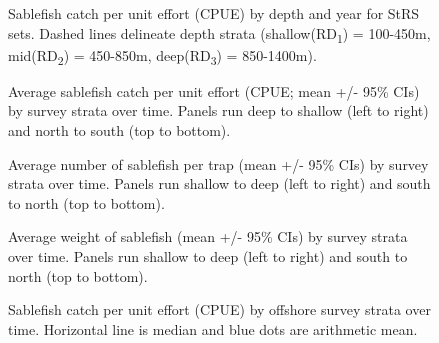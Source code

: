 \documentclass[12pt]{article}\usepackage[]{graphicx}\usepackage[]{color}
\begin{document}
\begin{figure}[htb]

{\centering {} 

}

\caption{Sablefish catch per unit effort (CPUE) by depth and year for StRS sets. Dashed lines delineate depth strata (shallow(RD\textsubscript{1}) = 100-450m, mid(RD\textsubscript{2}) = 450-850m, deep(RD\textsubscript{3}) = 850-1400m).}\label{fig:figure5}
\end{figure}
\clearpage


\begin{figure}[htb]

{\centering {} 

}

\caption{Average sablefish catch per unit effort (CPUE; mean +/- 95\% CIs) by survey strata over time. Panels run deep to shallow (left to right) and north to south (top to bottom).}\label{fig:figure6}
\end{figure}
\clearpage


\begin{figure}[htb]

{\centering {} 

}

\caption{Average number of sablefish per trap (mean +/- 95\% CIs) by survey strata over time. Panels run shallow to deep (left to right) and south to north (top to bottom).}\label{fig:figure7}
\end{figure}
\clearpage


\begin{figure}[htb]

{\centering {} 

}

\caption{Average weight of sablefish (mean +/- 95\% CIs) by survey strata over time. Panels run shallow to deep (left to right) and south to north (top to bottom).}\label{fig:figure8}
\end{figure}

\begin{figure}[htb]

{\centering {} 

}

\caption{Sablefish catch per unit effort (CPUE) by offshore survey strata over time. Horizontal line is median and blue dots are arithmetic mean.}\label{fig:figure9}
\end{figure}
\clearpage
\end{document}

